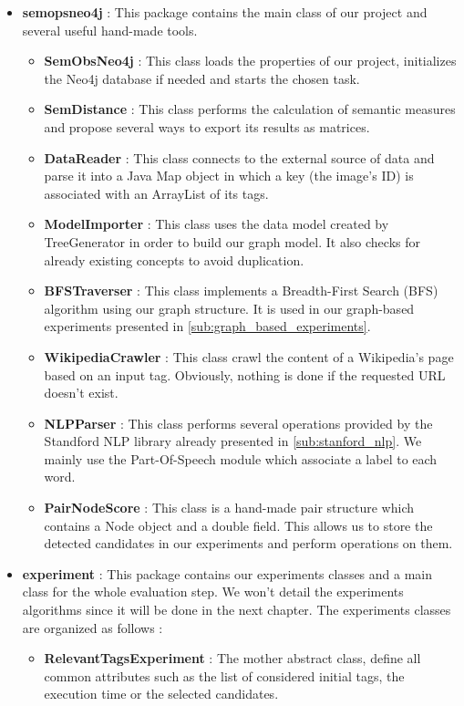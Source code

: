 \begin{itemize}
  	\item \textbf{semopsneo4j} : This package contains the main class of our project and several useful hand-made tools.
  	\begin{itemize}
  		\item \textbf{SemObsNeo4j} : This class loads the properties of our project, initializes the Neo4j database if needed and starts the chosen task.
  		\item \textbf{SemDistance} : This class performs the calculation of semantic measures and propose several ways to export its results as matrices.
  		\item \textbf{DataReader} : This class connects to the external source of data and parse it into a Java Map object in which a key (the image's ID) is associated with an ArrayList of its tags.
  		\item \textbf{ModelImporter} : This class uses the data model created by TreeGenerator in order to build our graph model. It also checks for already existing concepts to avoid duplication.
  		\item \textbf{BFSTraverser} : This class implements a Breadth-First Search (BFS) algorithm using our graph structure. It is used in our graph-based experiments presented in \ref{sub:graph_based_experiments}.
  		\item \textbf{WikipediaCrawler} : This class crawl the content of a Wikipedia's page based on an input tag. Obviously, nothing is done if the requested URL doesn't exist.
  		\item \textbf{NLPParser} : This class performs several operations provided by the Standford NLP library already presented in \ref{sub:stanford_nlp}. We mainly use the Part-Of-Speech module which associate a label to each word. 
  		\item \textbf{PairNodeScore} : This class is a hand-made pair structure which contains a Node object and a double field. This allows us to store the detected candidates in our experiments and perform operations on them. 
  	\end{itemize}
  	\item \textbf{experiment} : This package contains our experiments classes and a main class for the whole evaluation step. We won't detail the experiments algorithms since it will be done in the next chapter. The experiments classes are organized as follows :
  	\begin{itemize}
  		\item \textbf{RelevantTagsExperiment} : The mother abstract class, define all common attributes such as the list of considered initial tags, the execution time or the selected candidates.\\

\end{itemize}
\end{itemize}
